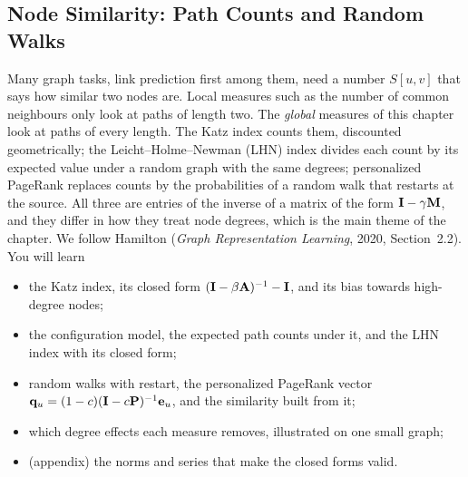 \begin{notechapter}
\forgetcs\bA{}
\forgetcs\bD{}
\forgetcs\bI{}
\forgetcs\bP{}
\forgetcs\bS{}
\forgetcs\bM{}
\forgetcs\bq{}
\forgetcs\bp{}
\forgetcs\be{}
\forgetcs\bv{}
\forgetcs\bx{}
\chapter{Node Similarity: Path Counts and Random Walks}\label{ch:node-similarity}

\begin{chapterintro}
Many graph tasks, link prediction first among them, need a number $S[u,v]$ that says how similar two nodes are. Local measures such as the number of common neighbours only look at paths of length two. The \emph{global} measures of this chapter look at paths of every length. The Katz index counts them, discounted geometrically; the Leicht--Holme--Newman (LHN) index divides each count by its expected value under a random graph with the same degrees; personalized PageRank replaces counts by the probabilities of a random walk that restarts at the source. All three are entries of the inverse of a matrix of the form $\mathbf{I} - \gamma\mathbf{M}$, and they differ in how they treat node degrees, which is the main theme of the chapter. We follow Hamilton (\emph{Graph Representation Learning}, 2020, Section~2.2). You will learn
\begin{itemize}[nosep]
  \item the Katz index, its closed form $(\mathbf{I} - \beta\mathbf{A})^{-1} - \mathbf{I}$, and its bias towards high-degree nodes;
  \item the configuration model, the expected path counts under it, and the LHN index with its closed form;
  \item random walks with restart, the personalized PageRank vector $\mathbf{q}_u = (1-c)(\mathbf{I} - c\mathbf{P})^{-1}\mathbf{e}_u$, and the similarity built from it;
  \item which degree effects each measure removes, illustrated on one small graph;
  \item (appendix) the norms and series that make the closed forms valid.
\end{itemize}
\end{chapterintro}


\end{notechapter}
